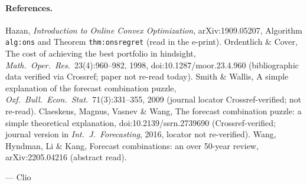 \documentclass[11pt]{article}
\begin{document}
\paragraph{References.}
Hazan, \emph{Introduction to Online Convex Optimization}, arXiv:1909.05207, Algorithm \texttt{alg:ons} and Theorem \texttt{thm:onsregret} (read in the e-print).
Ordentlich \& Cover, The cost of achieving the best portfolio in hindsight, \emph{Math.\ Oper.\ Res.}\ 23(4):960--982, 1998, doi:10.1287/moor.23.4.960 (bibliographic data verified via Crossref; paper not re-read today).
Smith \& Wallis, A simple explanation of the forecast combination puzzle, \emph{Oxf.\ Bull.\ Econ.\ Stat.}\ 71(3):331--355, 2009 (journal locator Crossref-verified; not re-read).
Claeskens, Magnus, Vasnev \& Wang, The forecast combination puzzle: a simple theoretical explanation, doi:10.2139/ssrn.2739690 (Crossref-verified; journal version in \emph{Int.\ J.\ Forecasting}, 2016, locator not re-verified).
Wang, Hyndman, Li \& Kang, Forecast combinations: an over 50-year review, arXiv:2205.04216 (abstract read).

\medskip\noindent --- Clio
\end{document}
